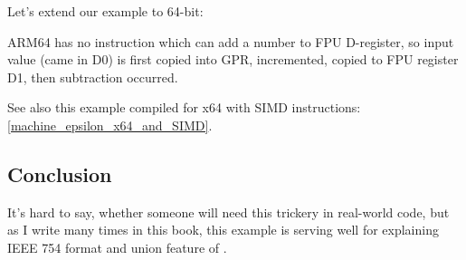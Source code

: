 Let's extend our example to 64-bit:



ARM64 has no instruction which can add a number to FPU D-register, 
so input value (came in D0) is first copied into GPR,
incremented, copied to FPU register D1, then subtraction occurred.



See also this example compiled for x64 with SIMD instructions: \ref{machine_epsilon_x64_and_SIMD}.

\subsection{Conclusion}

It's hard to say, whether someone will need this trickery in real-world code, 
but as I write many times in this book, this example is serving well 
for explaining IEEE 754 format and union feature of \CCpp.
\fi
